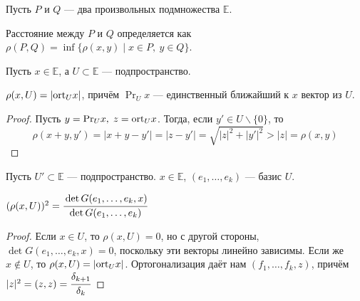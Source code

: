 Пусть $P$ и $Q$ --- два произвольных подмножества $\mathbb{E}$.
\begin{Def}
	Расстояние между $P$ и $Q$ определяется как $\rho (P,Q) = \inf \{\rho(x,y)\;|\; x\in P,\ y\in Q\}$.
\end{Def}
Пусть $x \in \mathbb{E}$, а $U \subset \mathbb{E}$ --- подпространство.
\begin{Theorem}
	$\rho (x,U) = |\mathrm{ort}_U x|$, причём $\Pr_U x$ --- единственный ближайший к $x$ вектор из $U$.
\end{Theorem}
\begin{proof}
	Пусть $y = \mathrm{Pr}_U x,\; z = \mathrm{ort}_U x$. Тогда, если $y' \in U\backslash \{0\}$, то 
	\[
		\rho(x+y, y') = |x + y - y'| = |z - y'| = \sqrt{|z|^2 + |y'|^2} > |z| = \rho(x,y)
	\]
\end{proof}
Пусть $U' \subset \mathbb{E}$ --- подпространство. $x \in \mathbb{E}$, $(e_1, \ldots, e_k)$ --- базис $U$.
\begin{Theorem}
	$(\rho(x,U))^2 = \cfrac{\det G(e_1, \ldots, e_k, x)}{\det G(e_1, \ldots, e_k)}$
\end{Theorem}
\begin{proof}
	Если $x \in U$, то $\rho (x,U) = 0$, но с другой стороны, $\det G(e_1, \ldots, e_k, x) = 0$, поскольку эти векторы линейно зависимы. Если же $x \notin U$, то $\rho(x,U) = |\mathrm{ort}_U x|$. Ортогонализация даёт нам $(f_1, \ldots, f_k, z)$, причём $|z|^2 = (z,z) = \cfrac{\delta_{k+1}}{\delta_{k}}$
\end{proof}
